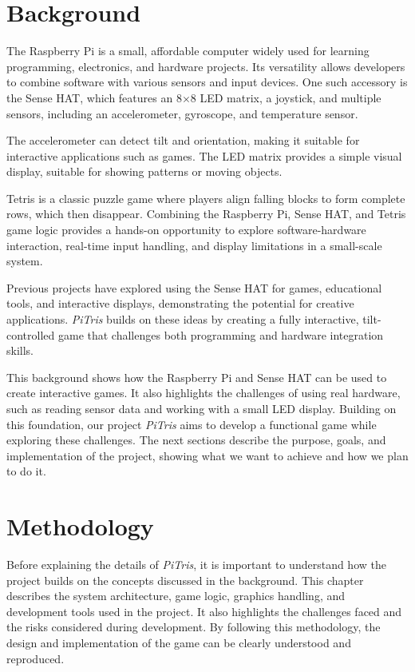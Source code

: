 \documentclass[11pt,titlepage,openright]{book}
\begin{document}
\chapter{Background}
\label{cha:background}

The Raspberry Pi is a small, affordable computer widely used for learning programming, electronics, and hardware projects. Its versatility allows developers to combine software with various sensors and input devices. One such accessory is the Sense HAT, which features an 8$\times$8 LED matrix, a joystick, and multiple sensors, including an accelerometer, gyroscope, and temperature sensor.

The accelerometer can detect tilt and orientation, making it suitable for interactive applications such as games. The LED matrix provides a simple visual display, suitable for showing patterns or moving objects.

Tetris is a classic puzzle game where players align falling blocks to form complete rows, which then disappear. Combining the Raspberry Pi, Sense HAT, and Tetris game logic provides a hands-on opportunity to explore software-hardware interaction, real-time input handling, and display limitations in a small-scale system.

Previous projects have explored using the Sense HAT for games, educational tools, and interactive displays, demonstrating the potential for creative applications. \textit{PiTris} builds on these ideas by creating a fully interactive, tilt-controlled game that challenges both programming and hardware integration skills.

This background shows how the Raspberry Pi and Sense HAT can be used to create interactive games. It also highlights the challenges of using real hardware, such as reading sensor data and working with a small LED display. Building on this foundation, our project \textit{PiTris} aims to develop a functional game while exploring these challenges. The next sections describe the purpose, goals, and implementation of the project, showing what we want to achieve and how we plan to do it.

\chapter{Methodology}
Before explaining the details of \textit{PiTris}, it is important to understand how the project builds on the concepts discussed in the background. This chapter describes the system architecture, game logic, graphics handling, and development tools used in the project. It also highlights the challenges faced and the risks considered during development. By following this methodology, the design and implementation of the game can be clearly understood and reproduced.
\end{document}
